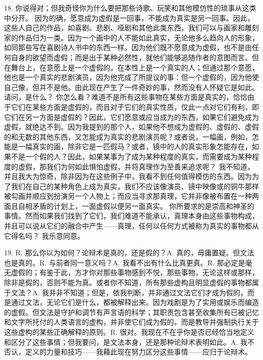 18.  你说得对；但我奇怪你为什么要把那些诗歌、玩笑和其他模仿性的琐事从这类中分开。 因为的确，愿意成为虚假是一回事，不能成为真实是另一回事。因此，这些人自己的作品，如喜剧、悲剧、哑剧和其他此类东西，我们可以与画家和雕刻家的作品归为一类。因为一个画中的人不能如此真实，无论他多么趋向人的形象，如同那些写在喜剧诗人书中的东西一样。因为他们既不愿意成为虚假，也不是由任何自身的欲望而虚假；而是出于某种必然性，就他们能够追随作者的意图而言。但在舞台上，在意愿上是一个虚假的，在本性上是一个真实的人；但通过那个意愿，他也是一个真实的悲剧演员，因为他完成了所提议的事：但一个虚假的，因为他使自己像，但并不是他。由此现在产生了一件奇妙的事，然而没有人怀疑它是如此。 请问，是什么？ 你怎么看？难道不是所有这些事物在某些方面是真实的，恰恰由于它们在某些方面是虚假的，而且对于它们的真实性质，仅此一点对它们有利，即它们在另一方面是虚假的？因此，它们愿意或应当成为的东西，如果它们避免成为虚假，就绝达不到。因为我提到的那个人，如果他不想成为虚假的、虚假的、虚假的和无数的其他东西，又怎能成为真实的悲剧演员呢？或者说，一幅画，例如，怎能是一幅真实的画，除非它是一匹假马？或者，镜中的人的真实形象怎能存在，如果不是一个假的人？因此，如果某事为了成为某种程度的真实，而需要成为某种程度的虚假，那我们为何如此惧怕虚假，并将真理作为至善来追求呢？ 我不知道，并且我大为惊奇，除非因为在这些例子中，我看不到任何值得模仿的东西。因为为了我们在自己的某种角色上成为真实，我们不应该像演员、镜中映像或的铜牛那样被勾画并顺应到扮演另一个人物上；而应当寻求那真理，它并非像被布置在一种两面且自相矛盾的计划上，一面虚假以便另一面真实。 你所要求的是崇高和神圣的事情。然而如果我们找到了它们，我们难道不能承认，真理本身由这些事物构成，并且可以说从它们的融合中产生——真理，任何以任何方式被称为真实的事物都从它得名吗？ 我乐意同意。\par

19. R. 那么你以为如何？论辩术是真的，还是假的？A. 真的，毋庸置疑。但文法也是真的。R. 与前者同一意义吗？A. 我看不出有什么比真更真。R. 那必定是毫无虚假的；有鉴于此，方才你对那些事物感到不悦，那些事物，无论这样或那样，除非是假的，否则不能为真。或者你不知道，所有那些虚构且明显虚假的事物都属于文法？A. 我并非不知道；但是，依我判断，并非通过文法它们才成为假的，而是通过文法，无论它们是什么，都被解释出来。因为戏剧是为了实用或娱乐而编造的虚假。但文法是守护和调节有声言语的科学；其职责包含甚至收集所有已被记忆和文字所托付的人类语言的虚构，并非使它们成为假的，而是教导并强制执行关于这些虚构的某些正确解释的原则。R. 很对。我现在不在乎你是否已经恰当地定义和区分了这些事情；但我要问，是文法本身，还是那种论辩术表明如此。A. 我不否认，定义的力量和技巧——我藉此现在努力区分这些事情——应归于论辩术。\par

